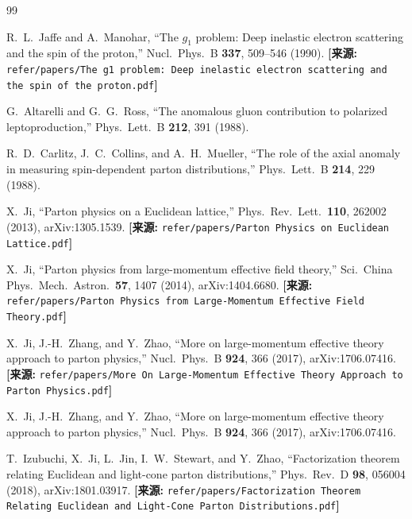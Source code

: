 \documentclass[12pt,a4paper]{ctexart}
\theoremstyle{definition}
\begin{document}
\begin{thebibliography}{99}


R.~L.~Jaffe and A.~Manohar,
``The $g_1$ problem: Deep inelastic electron scattering and the spin of the proton,''
Nucl.\ Phys.\ B \textbf{337}, 509--546 (1990).
\quad\textbf{[来源:} \texttt{refer/papers/The g1 problem: Deep inelastic electron scattering and the spin of the proton.pdf}\textbf{]}

G.~Altarelli and G.~G.~Ross,
``The anomalous gluon contribution to polarized leptoproduction,''
Phys.\ Lett.\ B \textbf{212}, 391 (1988).

R.~D.~Carlitz, J.~C.~Collins, and A.~H.~Mueller,
``The role of the axial anomaly in measuring spin-dependent parton distributions,''
Phys.\ Lett.\ B \textbf{214}, 229 (1988).


X.~Ji,
``Parton physics on a Euclidean lattice,''
Phys.\ Rev.\ Lett.\ \textbf{110}, 262002 (2013), arXiv:1305.1539.
\quad\textbf{[来源:} \texttt{refer/papers/Parton Physics on Euclidean Lattice.pdf}\textbf{]}

X.~Ji,
``Parton physics from large-momentum effective field theory,''
Sci.\ China Phys.\ Mech.\ Astron.\ \textbf{57}, 1407 (2014), arXiv:1404.6680.
\quad\textbf{[来源:} \texttt{refer/papers/Parton Physics from Large-Momentum Effective Field Theory.pdf}\textbf{]}

X.~Ji, J.-H.~Zhang, and Y.~Zhao,
``More on large-momentum effective theory approach to parton physics,''
Nucl.\ Phys.\ B \textbf{924}, 366 (2017), arXiv:1706.07416.
\quad\textbf{[来源:} \texttt{refer/papers/More On Large-Momentum Effective Theory Approach to Parton Physics.pdf}\textbf{]}

X.~Ji, J.-H.~Zhang, and Y.~Zhao,
``More on large-momentum effective theory approach to parton physics,''
Nucl.\ Phys.\ B \textbf{924}, 366 (2017), arXiv:1706.07416.

T.~Izubuchi, X.~Ji, L.~Jin, I.~W.~Stewart, and Y.~Zhao,
``Factorization theorem relating Euclidean and light-cone parton distributions,''
Phys.\ Rev.\ D \textbf{98}, 056004 (2018), arXiv:1801.03917.
\quad\textbf{[来源:} \texttt{refer/papers/Factorization Theorem Relating Euclidean and Light-Cone Parton Distributions.pdf}\textbf{]}


\end{thebibliography}
\end{document}
